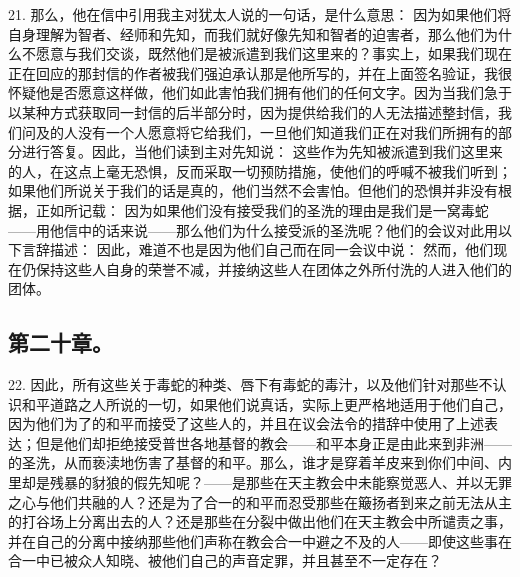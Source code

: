 21. 那么，他在信中引用我主对犹太人说的一句话，是什么意思： 因为如果他们将自身理解为智者、经师和先知，而我们就好像先知和智者的迫害者，那么他们为什么不愿意与我们交谈，既然他们是被派遣到我们这里来的？事实上，如果我们现在正在回应的那封信的作者被我们强迫承认那是他所写的，并在上面签名验证，我很怀疑他是否愿意这样做，他们如此害怕我们拥有他们的任何文字。因为当我们急于以某种方式获取同一封信的后半部分时，因为提供给我们的人无法描述整封信，我们问及的人没有一个人愿意将它给我们，一旦他们知道我们正在对我们所拥有的部分进行答复。因此，当他们读到主对先知说： 这些作为先知被派遣到我们这里来的人，在这点上毫无恐惧，反而采取一切预防措施，使他们的呼喊不被我们听到；如果他们所说关于我们的话是真的，他们当然不会害怕。但他们的恐惧并非没有根据，正如所记载： 因为如果他们没有接受我们的圣洗的理由是我们是一窝毒蛇——用他信中的话来说——那么他们为什么接受派的圣洗呢？他们的会议对此用以下言辞描述： 因此，难道不也是因为他们自己而在同一会议中说： 然而，他们现在仍保持这些人自身的荣誉不减，并接纳这些人在团体之外所付洗的人进入他们的团体。\par


\subsection{第二十章。}

22. 因此，所有这些关于毒蛇的种类、唇下有毒蛇的毒汁，以及他们针对那些不认识和平道路之人所说的一切，如果他们说真话，实际上更严格地适用于他们自己，因为他们为了的和平而接受了这些人的，并且在议会法令的措辞中使用了上述表达；但是他们却拒绝接受普世各地基督的教会——和平本身正是由此来到非洲——的圣洗，从而亵渎地伤害了基督的和平。那么，谁才是穿着羊皮来到你们中间、内里却是残暴的豺狼的假先知呢？——是那些在天主教会中未能察觉恶人、并以无罪之心与他们共融的人？还是为了合一的和平而忍受那些在簸扬者到来之前无法从主的打谷场上分离出去的人？还是那些在分裂中做出他们在天主教会中所谴责之事，并在自己的分离中接纳那些他们声称在教会合一中避之不及的人——即使这些事在合一中已被众人知晓、被他们自己的声音定罪，并且甚至不一定存在？\par

